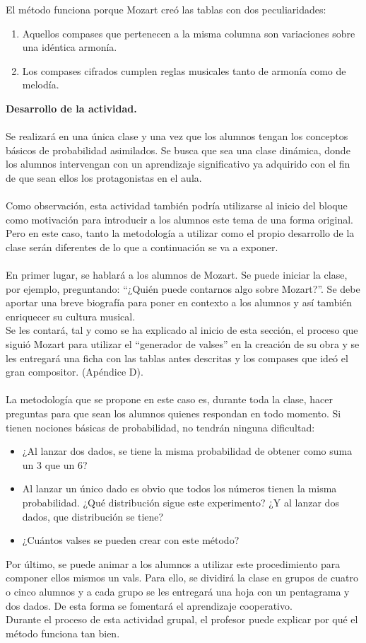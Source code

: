 \documentclass[a4paper, openright, 11pt, titlepage]{report}
\theoremstyle{definition}\newtheorem{defin}[propo]{Definition}
\theoremstyle{definition}\newtheorem{obser}[propo]{Remark}
\theoremstyle{definition}\newtheorem{ejem}[propo]{Ejemplo}
\theoremstyle{definition}\newtheorem{algoritmo}[propo]{Algoritmo}
\begin{document}
El método funciona porque Mozart creó las tablas con dos peculiaridades:
\begin{enumerate}
    \item Aquellos compases que pertenecen a la misma columna son variaciones sobre una idéntica armonía.
    \item Los compases cifrados cumplen reglas musicales tanto de armonía como de melodía.
\end{enumerate}
\textbf{Desarrollo de la actividad.}\\\\
Se realizará en una única clase y una vez que los alumnos tengan los conceptos básicos de probabilidad asimilados. Se busca que sea una clase dinámica, donde los alumnos intervengan con un aprendizaje significativo ya adquirido con el fin de que sean ellos los protagonistas en el aula.\\\\
Como observación, esta actividad también podría utilizarse al inicio del bloque como motivación para introducir a los alumnos este tema de una forma original. Pero en este caso, tanto la metodología a utilizar como el propio desarrollo de la clase serán diferentes de lo que a continuación se va a exponer.\\\\
En primer lugar, se hablará a los alumnos de Mozart. Se puede iniciar la clase, por ejemplo, preguntando: ``¿Quién puede contarnos algo sobre Mozart?''. Se debe aportar una breve biografía para poner en contexto a los alumnos y así también enriquecer su cultura musical.\\
Se les contará, tal y como se ha explicado al inicio de esta sección, el proceso que siguió Mozart para utilizar el “generador de valses” en la creación de su obra y se les entregará una ficha con las tablas antes descritas y los compases que ideó el gran compositor. (Apéndice D).\\\\
La metodología que se propone en este caso es, durante toda la clase, hacer preguntas para que sean los alumnos quienes respondan en todo momento. Si tienen nociones básicas de probabilidad, no tendrán ninguna dificultad:
\begin{itemize}
    \item ¿Al lanzar dos dados, se tiene la misma probabilidad de obtener como suma un 3 que un 6?
    \item Al lanzar un único dado es obvio que todos los números tienen la misma probabilidad. ¿Qué distribución sigue este experimento? ¿Y al lanzar dos dados, que distribución se tiene?
    \item ¿Cuántos valses se pueden crear con este método?
\end{itemize}
Por último, se puede animar a los alumnos a utilizar este procedimiento para componer ellos mismos un vals. Para ello, se dividirá la clase en grupos de cuatro o cinco alumnos y a cada grupo se les entregará una hoja con un pentagrama y dos dados. De esta forma se fomentará el aprendizaje cooperativo.\\
Durante el proceso de esta actividad grupal, el profesor puede explicar por qué el método funciona tan bien.  
\end{document}
